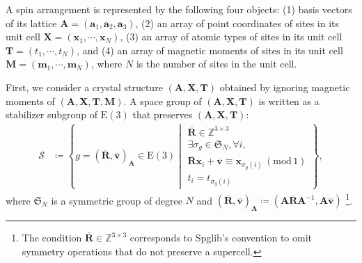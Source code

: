 \documentclass[a4paper, 11pt]{article}
\theoremstyle{definition}
\newcommand{\relmiddle}[1]{\mathrel{}\middle#1\mathrel{}}
\newcommand{\set}[2]{\left\{ #1 \relmiddle| #2 \right\}}
\begin{document}
A spin arrangement is represented by the following four objects:
(1) basis vectors of its lattice $\bm{A} = (\bm{a}_{1}, \bm{a}_{2}, \bm{a}_{3})$,
(2) an array of point coordinates of sites in its unit cell $\bm{X} = (\bm{x}_{1}, \cdots, \bm{x}_{N})$,
(3) an array of atomic types of sites in its unit cell $\bm{T} = (t_{1}, \cdots, t_{N})$,
and (4) an array of magnetic moments of sites in its unit cell $\bm{M} = (\bm{m}_{1}, \cdots, \bm{m}_{N})$,
where $N$ is the number of sites in the unit cell.

First, we consider a crystal structure $(\bm{A}, \bm{X}, \bm{T})$ obtained by ignoring magnetic moments of $(\bm{A}, \bm{X}, \bm{T}, \bm{M})$.
A space group of $(\bm{A}, \bm{X}, \bm{T})$ is written as a stabilizer subgroup of $\mathrm{E}(3)$ that preserves $(\bm{A}, \bm{X}, \bm{T})$:
\begin{align}
    \mathcal{S}
        &\coloneqq \set{
                g = ( \overline{\bm{R}}, \overline{\bm{v}} )_{\bm{A}} \in \mathrm{E}(3)
            }{
                \begin{array}{l}
                    \overline{\bm{R}} \in \mathbb{Z}^{3 \times 3} \\
                    \exists \sigma_{g} \in \mathfrak{S}_{N}, \forall i, \\
                    \overline{\bm{R}} \bm{x}_{i} + \overline{\bm{v}} \equiv \bm{x}_{\sigma_{g}(i)} \, (\mathrm{mod} \, 1) \\
                    t_{i} = t_{\sigma_{g}(i)}
                \end{array}
            },
\end{align}
where $\mathfrak{S}_{N}$ is a symmetric group of degree $N$ and $( \overline{\bm{R}}, \overline{\bm{v}} )_{\bm{A}} \coloneqq ( \bm{A}\overline{\bm{R}}\bm{A}^{-1}, \bm{A}\overline{\bm{v}} )$ \footnote {
  The condition $\overline{\bm{R}} \in \mathbb{Z}^{3 \times 3}$ corresponds to Spglib's convention to omit symmetry operations that do not preserve a supercell.
}.
\end{document}

